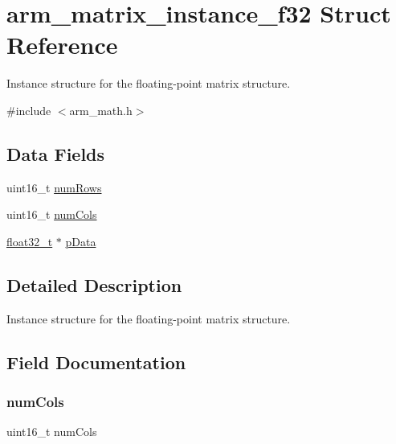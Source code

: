 \hypertarget{structarm__matrix__instance__f32}{}\section{arm\+\_\+matrix\+\_\+instance\+\_\+f32 Struct Reference}
\label{structarm__matrix__instance__f32}


Instance structure for the floating-\/point matrix structure.  




{\ttfamily \#include $<$arm\+\_\+math.\+h$>$}

\subsection*{Data Fields}
\begin{DoxyCompactItemize}
\item 
uint16\+\_\+t \mbox{\hyperlink{structarm__matrix__instance__f32_a1bcf80ccdc2acc29198f1592ae300390}{num\+Rows}}
\item 
uint16\+\_\+t \mbox{\hyperlink{structarm__matrix__instance__f32_a4bb5ec0d13eb4c9cf887aa8366a44117}{num\+Cols}}
\item 
\mbox{\hyperlink{arm__math_8h_a4611b605e45ab401f02cab15c5e38715}{float32\+\_\+t}} $\ast$ \mbox{\hyperlink{structarm__matrix__instance__f32_af5c3a2f15c98850cdcfbe6f87e5ac5df}{p\+Data}}
\end{DoxyCompactItemize}


\subsection{Detailed Description}
Instance structure for the floating-\/point matrix structure. 

\subsection{Field Documentation}
\mbox{\label{structarm__matrix__instance__f32_a4bb5ec0d13eb4c9cf887aa8366a44117}} 
\subsubsection{\texorpdfstring{num\+Cols}{numCols}}
{\footnotesize\ttfamily uint16\+\_\+t num\+Cols}

